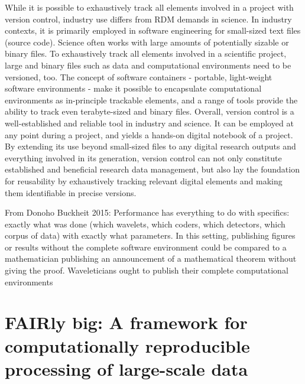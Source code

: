 While it is possible to exhaustively track all elements involved in a project with version control, industry use differs from RDM demands in science.
In industry contexts, it is primarily employed in software engineering for small-sized text files (source code). Science often works with large amounts of potentially sizable or binary files.
To exhaustively track all elements involved in a scientific project, large and binary files such as data and computational environments need to be versioned, too.
The concept of software containers - portable, light-weight software environments - make it possible to encapsulate computational environments as in-principle trackable elements, and a range of tools provide the ability to track even terabyte-sized and binary files.
Overall, version control is a well-established and reliable tool in industry and science. It can be employed at any point during a project, and yields a hands-on digital notebook of a project.
By extending its use beyond small-sized files to any digital research outputs and everything involved in its generation, version control can not only constitute established and beneficial research data management, but also lay the foundation for reusability by exhaustively tracking relevant digital elements and making them identifiable in precise versions.

From Donoho Buckheit 2015: Performance has everything to do with specifics: exactly what was done (which wavelets,
which coders, which detectors, which corpus of data) with exactly what parameters. In
this setting, publishing figures or results without the complete software environment could
be compared to a mathematician publishing an announcement of a mathematical theorem
without giving the proof. Waveleticians ought to publish their complete computational
environments


\pagebreak

\section{FAIRly big: A framework for computationally reproducible processing of large-scale data}




